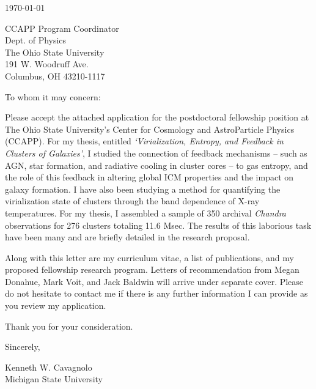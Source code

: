 \documentclass[11pt]{article}
\begin{document}
\today

CCAPP Program Coordinator\\
Dept. of Physics\\
The Ohio State University\\
191 W. Woodruff Ave.\\
Columbus, OH 43210-1117

To whom it may concern:

Please accept the attached application for the postdoctoral
fellowship position at The Ohio State University's Center for
Cosmology and AstroParticle Physics (CCAPP). For my thesis, entitled
{\textit{`Virialization, Entropy, and Feedback in Clusters of
Galaxies'}}, I studied the connection of feedback mechanisms --
such as AGN, star formation, and radiative cooling in cluster cores --
to gas entropy, and the role of this feedback in altering global
ICM properties and the impact on galaxy formation. I have also been
studying a method for quantifying the virialization state of clusters
through the band dependence of X-ray temperatures. For my thesis, I
assembled a sample of 350 archival {\textit{Chandra}} observations for
276 clusters totaling 11.6 Msec. The results of this laborious task
have been many and are briefly detailed in the research proposal.

Along with this letter are my curriculum vitae, a list of
publications, and my proposed fellowship research program. Letters of
recommendation from Megan Donahue, Mark Voit, and Jack Baldwin will
arrive under separate cover. Please do not hesitate to contact me if
there is any further information I can provide as you review my
application.

Thank you for your consideration.

Sincerely,\\
\begin{minipage}{7.5in}
\end{minipage}
Kenneth W. Cavagnolo\\
Michigan State University
\end{document}
